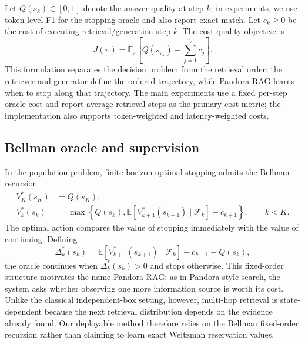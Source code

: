 \documentclass{article}
\newcommand{\method}{Pandora-RAG}
\begin{document}
Let $Q(s_k)\in[0,1]$ denote the answer quality at step $k$; in experiments, we use token-level F1 for the stopping oracle and also report exact match. Let $c_k\ge 0$ be the cost of executing retrieval/generation step $k$. The cost-quality objective is
\begin{equation}
  J(\pi)
  =
  \mathbb{E}_{\pi}\left[
    Q(s_{\tau_\pi})-\sum_{j=1}^{\tau_\pi}c_j
  \right].
  \label{eq:utility}
\end{equation}
This formulation separates the decision problem from the retrieval order: the retriever and generator define the ordered trajectory, while \method{} learns when to stop along that trajectory. The main experiments use a fixed per-step oracle cost and report average retrieval steps as the primary cost metric; the implementation also supports token-weighted and latency-weighted costs.

\subsection{Bellman oracle and supervision}
\label{sec:bellman-oracle}

In the population problem, finite-horizon optimal stopping admits the Bellman recursion
\begin{align}
  V_K^*(s_K) &= Q(s_K), \\
  V_k^*(s_k) &=
  \max\left\{
    Q(s_k),
    \mathbb{E}\left[V_{k+1}^*(s_{k+1})\mid\mathcal{F}_k\right]-c_{k+1}
  \right\},
  \qquad k<K .
  \label{eq:bellman}
\end{align}
The optimal action compares the value of stopping immediately with the value of continuing. Defining
\[
  \Delta_k^*(s_k)=
  \mathbb{E}\left[V_{k+1}^*(s_{k+1})\mid\mathcal{F}_k\right]
  -c_{k+1}-Q(s_k),
\]
the oracle continues when $\Delta_k^*(s_k)>0$ and stops otherwise. This fixed-order structure motivates the name \method{}: as in Pandora-style search, the system asks whether observing one more information source is worth its cost. Unlike the classical independent-box setting, however, multi-hop retrieval is state-dependent because the next retrieval distribution depends on the evidence already found. Our deployable method therefore relies on the Bellman fixed-order recursion rather than claiming to learn exact Weitzman reservation values.
\end{document}
